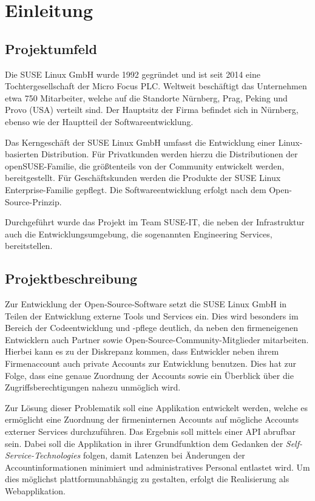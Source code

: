 \section{Einleitung}
\label{sec:Einleitung}

\subsection{Projektumfeld}
\label{sec:Projektumfeld}
Die SUSE Linux GmbH wurde 1992 gegründet und ist seit 2014 eine Tochtergesellschaft der Micro Focus
PLC. Weltweit beschäftigt das Unternehmen etwa 750 Mitarbeiter, welche auf die Standorte Nürnberg,
Prag, Peking und Provo (USA) verteilt sind. Der Hauptsitz der Firma befindet sich in Nürnberg,
ebenso wie der Hauptteil der Softwareentwicklung.

Das Kerngeschäft der SUSE Linux GmbH umfasst die Entwicklung einer Linux-basierten Distribution.
Für Privatkunden werden hierzu die Distributionen der openSUSE-Familie, die größtenteils von der
Community entwickelt werden, bereitgestellt. Für Geschäftskunden werden die Produkte der SUSE Linux
Enterprise-Familie gepflegt. Die Softwareentwicklung erfolgt nach dem Open-Source-Prinzip.

Durchgeführt wurde das Projekt im Team SUSE-IT, die neben der Infrastruktur auch die
Entwicklungsumgebung, die sogenannten Engineering Services, bereitstellen.

\subsection{Projektbeschreibung}
\label{sec:Projektbeschreibung}
Zur Entwicklung der Open-Source-Software setzt die SUSE Linux GmbH in Teilen der Entwicklung
externe Tools und Services ein. Dies wird besonders im Bereich der Codeentwicklung und -pflege
deutlich, da neben den firmeneigenen Entwicklern auch Partner sowie Open-Source-Community-Mitglieder
mitarbeiten. Hierbei kann es zu der Diskrepanz kommen, dass Entwickler neben ihrem Firmenaccount
auch private Accounts zur Entwicklung benutzen. Dies hat zur Folge, dass eine genaue Zuordnung
der Accounts sowie ein Überblick über die Zugriffsberechtigungen nahezu unmöglich wird.

Zur Lösung dieser Problematik soll eine Applikation entwickelt werden, welche es ermöglicht
eine Zuordnung der firmeninternen Accounts auf mögliche Accounts externer Services durchzuführen.
Das Ergebnis soll mittels einer \acs{API} abrufbar sein.
Dabei soll die Applikation in ihrer Grundfunktion dem Gedanken der \textit{Self-Service-Technologies} folgen,
damit Latenzen bei Änderungen der Accountinformationen minimiert und administratives Personal
entlastet wird. Um dies möglichst plattformunabhängig zu gestalten, erfolgt die Realisierung als
Webapplikation.

